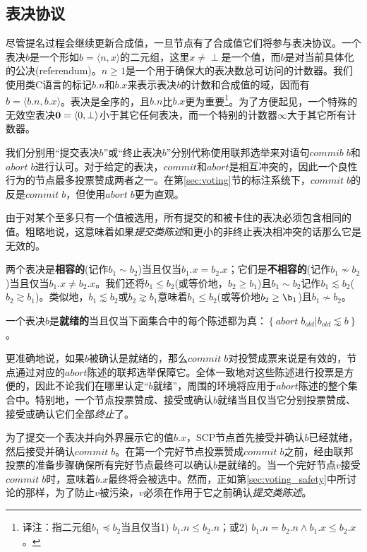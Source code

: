 \subsection{表决协议}
尽管提名过程会继续更新合成值，一旦节点有了合成值它们将参与表决协议。一个表决$b$是一个形如$b=\langle n,x\rangle$的二元组，这里$x\neq \perp$是一个值，而$b$是对当前{\slot}具体化的公决(referendum)。$n\geq 1$是一个用于确保大的表决数总可访问的计数器。我们使用类C语言的标记$b.n$和$b.x$来表示表决$b$的计数和合成值的域，因而有$b=\langle b.n, b.x\rangle$。表决是全序的，且$b.n$比$b.x$更为重要{\footnote{译注：指二元组$b_1\preceq b_2$当且仅当1) $b_1.n \leq b_2.n$；或2) $b_1.n=b_2.n \wedge b_1.x \leq b_2.x$。}}。为了方便起见，一个特殊的无效空表决${\bm 0}=\langle 0,\perp\rangle$小于其它任何表决，而一个特别的计数器$\infty$大于其它所有计数器。

我们分别用``提交表决$b$''或``终止表决$b$''分别代称使用联邦选举来对语句$commib\;b$和$abort\;b$进行认可。对于给定的表决，$commit$和$abort$是相互冲突的，因此一个良性行为的节点最多投票赞成两者之一。在第\ref{sec:voting}节的标注系统下，$commit\;b$的反是$\overline{commit\;b}$，但使用$abort\;b$更为直观。

由于对某个{\slot}至多只有一个值被选用，所有提交的和被卡住的表决必须包含相同的值。粗略地说，这意味着如果\textit{提交类陈述}和更小的非终止表决相冲突的话那么它是无效的。

\begin{definition}[相容的]
        两个表决是\textbf{相容的}(记作$b_1 \sim b_2$)当且仅当$b_1.x=b_2.x$；它们是\textbf{不相容的}(记作$b_1\not\sim b_2$)当且仅当$b_1.x\neq b_2.x$。我们还将$b_1\leq b_2$(或等价地，$b_2\geq b_1$)且$b_1\sim b_2$记作$b_1\lesssim b_2$($b_2\gtrsim b_1$)。类似地，$b_1\lnsim b_2$或$b_2\gnsim b_1$意味着$b_1\leq b_2$(或等价地$b_2\geq \b_1$)且$b_1\not\sim b_2$。
\end{definition}

\begin{definition}[就绪的]
        一个表决$b$是\textbf{就绪的}当且仅当下面集合中的每个陈述都为真：$\left\{abort\;b_{old}|b_{old}\lnsim b\right\}$。
\end{definition}

更准确地说，如果$b$被确认是就绪的，那么$commit\;b$对投赞成票来说是有效的，节点通过对应的$abort$陈述的联邦选举保障它。全体一致地对这些陈述进行投票是方便的，因此不论我们在哪里认定{}``$b$就绪''，周围的环境将应用于$abort$陈述的整个集合中。特别地，一个节点投票赞成、接受或确认$b$就绪当且仅当它分别投票赞成、接受或确认它们全部\textit{终止}了。

为了提交一个表决并向外界展示它的值$b.x$，SCP节点首先接受并确认$b$已经就绪，然后接受并确认$commit\;b$。在第一个完好节点投票赞成$commit\;b$之前，经由联邦投票的准备步骤确保所有完好节点最终可以确认$b$是就绪的。当一个完好节点$v$接受$commit\;b$时，意味着$b.x$最终将会被选中。然而，正如第\ref{sec:voting_safety}中所讨论的那样，为了防止$v$被污染，$v$必须在作用于它之前确认\textit{提交类陈述}。


